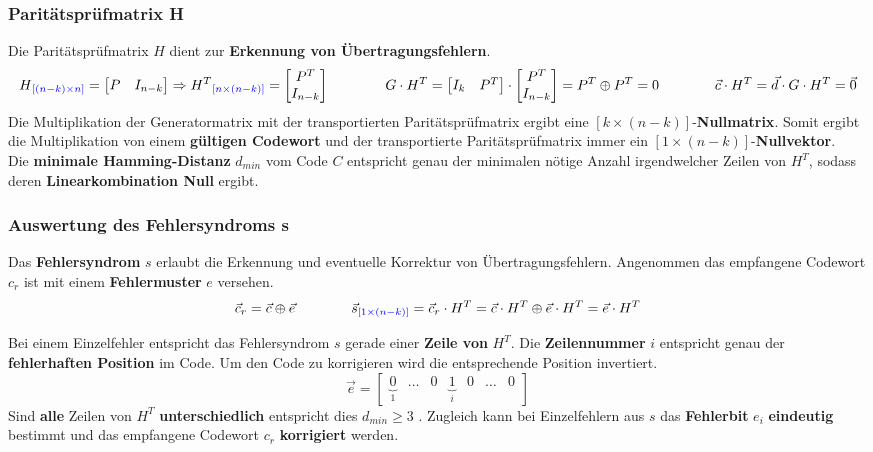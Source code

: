 \subsubsection{Paritätsprüfmatrix H } \label{paritycheckmatrix}
Die Paritätsprüfmatrix $H$ dient zur \textbf{Erkennung von Übertragungsfehlern}. 
$$H\textcolor{blue}{_{[(n-k) \times n]}} = \begin{bmatrix}P & I_{n-k}\end{bmatrix} \Rightarrow
H^T\textcolor{blue}{_{[n \times (n-k)]}} =
\begin{bmatrix} P^T \\ I_{n-k}\end{bmatrix} 
\qquad \qquad 
G \cdot H^T = \begin{bmatrix}I_k & P^T\end{bmatrix} \cdot 
 \begin{bmatrix} P^T \\ I_{n-k}\end{bmatrix} = P^T \oplus P^T = 0
	\qquad \qquad
	\vec{c} \cdot H^T = \vec{d} \cdot G \cdot H^T = \vec{0}
	 $$
Die Multiplikation der Generatormatrix mit der transportierten Paritätsprüfmatrix ergibt eine 
$[k \times (n-k)]$-\textbf{Nullmatrix}. Somit ergibt die Multiplikation von einem
\textbf{gültigen Codewort} und der transportierte Paritätsprüfmatrix immer ein $[1
\times (n-k)]$-\textbf{Nullvektor}. \\
Die \textbf{minimale Hamming-Distanz} $d_{min}$ vom Code $C$ entspricht genau der minimalen
nötige Anzahl irgendwelcher Zeilen von $H^T$, sodass deren \textbf{Linearkombination Null} ergibt.


\subsubsection{Auswertung des Fehlersyndroms s }
Das \textbf{Fehlersyndrom} $s$ erlaubt die Erkennung und eventuelle Korrektur von Übertragungsfehlern.
Angenommen das empfangene Codewort $c_r$ ist mit einem \textbf{Fehlermuster} $e$ versehen.
$$\vec{c}_r = \vec{c} \oplus \vec{e} \qquad \qquad \vec{s}\textcolor{blue}{_{[1 \times (n-k)]}} = \vec{c}_r \cdot H^T = \vec{c}
\cdot H^T \oplus \vec{e} \cdot H^T = \vec{e} \cdot H^T$$

Bei einem Einzelfehler entspricht das Fehlersyndrom $s$ gerade einer \textbf{Zeile von }
\boldmath$H^T$\unboldmath . Die \textbf{Zeilennummer} $i$ entspricht genau der \textbf{fehlerhaften
Position} im Code. Um den Code zu korrigieren wird die entsprechende Position invertiert.
$$ \vec{e} = \begin{bmatrix} \underbrace{0}_{1} & \ldots & 0 & \underbrace{1}_i & 0 & \ldots & 0\end{bmatrix} $$ 
Sind \textbf{alle} Zeilen von $H^T$ \textbf{unterschiedlich} entspricht dies \boldmath $d_{min}
\geq 3$ \unboldmath . 
Zugleich kann bei Einzelfehlern aus $s$ das \textbf{Fehlerbit} $e_i$ \textbf{eindeutig} bestimmt und das 
empfangene Codewort $c_r$ \textbf{korrigiert} werden. \\

